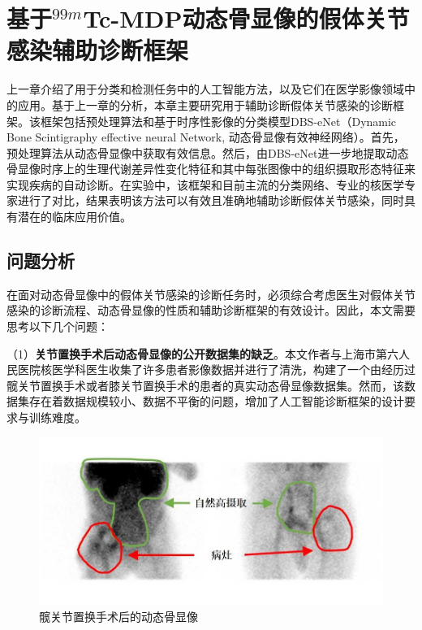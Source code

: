 \chapter{基于\texorpdfstring{\(^{99m}\)}{99m}Tc-MDP动态骨显像的假体关节感染辅助诊断框架}

上一章介绍了用于分类和检测任务中的人工智能方法，以及它们在医学影像领域中的应用。基于上一章的分析，本章主要研究用于辅助诊断假体关节感染的诊断框架。该框架包括预处理算法和基于时序性影像的分类模型DBS-eNet（Dynamic Bone Scintigraphy effective neural Network, 动态骨显像有效神经网络）\cite{nie2023artificial}。首先，预处理算法从动态骨显像中获取有效信息。然后，由DBS-eNet进一步地提取动态骨显像时序上的生理代谢差异性变化特征和其中每张图像中的组织摄取形态特征来实现疾病的自动诊断。在实验中，该框架和目前主流的分类网络、专业的核医学专家进行了对比，结果表明该方法可以有效且准确地辅助诊断假体关节感染，同时具有潜在的临床应用价值。

\section{问题分析}

在面对动态骨显像中的假体关节感染的诊断任务时，必须综合考虑医生对假体关节感染的诊断流程、动态骨显像的性质和辅助诊断框架的有效设计。因此，本文需要思考以下几个问题：

（1）\textbf{关节置换手术后动态骨显像的公开数据集的缺乏}。本文作者与上海市第六人民医院核医学科医生收集了许多患者影像数据并进行了清洗，构建了一个由经历过髋关节置换手术或者膝关节置换手术的患者的真实动态骨显像数据集。然而，该数据集存在着数据规模较小、数据不平衡的问题，增加了人工智能诊断框架的设计要求与训练难度。

\begin{figure}[h]
  \centering
  \includegraphics{figures/chap03_hip.jpg}
  \caption{髋关节置换手术后的动态骨显像}
  \label{fig:chap03_hip}
\end{figure}

